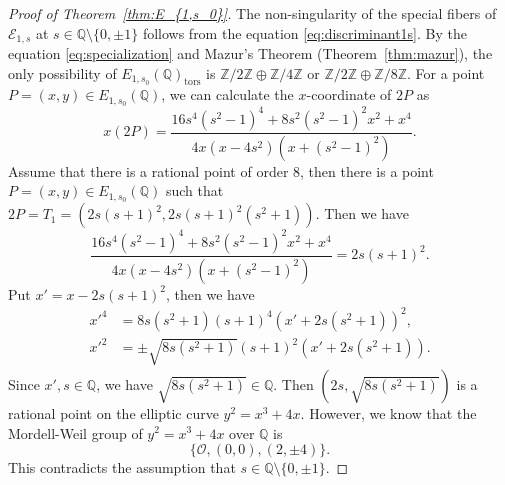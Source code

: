 \documentclass[main]{subfiles}
\begin{document}
\begin{proof}[Proof of Theorem~{\ref{thm:E_{1,s_0}}}]
    The non-singularity of the special fibers of $\mathcal{E}_{1,s}$ at $s \in \mathbb{Q} \setminus \{0,\pm 1 \}$ follows from the equation \eqref{eq:discriminant1s}.
    By the equation \eqref{eq:specialization} and Mazur's Theorem (Theorem~\ref{thm:mazur}), the only possibility of $E_{1,s_0}(\mathbb{Q})_{\text{tors}}$ is $\mathbb{Z} / 2 \mathbb{Z} \oplus \mathbb{Z} / 4 \mathbb{Z}$ or $\mathbb{Z} / 2 \mathbb{Z} \oplus \mathbb{Z} / 8 \mathbb{Z}$.
    For a point $P=(x,y) \in E_{1,s_0}(\mathbb{Q})$, we can calculate the $x$-coordinate of $2P$ as
    \begin{equation*}
        x(2P) = \frac{16s^{4}(s^{2} - 1)^{4} + 8 s^{2}(s^{2} - 1)^{2} x^{2} + x^{4}}{4 x (x - 4s^{2}) (x + (s^{2} - 1)^{2})}.
    \end{equation*}
    Assume that there is a rational point of order $8$, then there is a point $P=(x,y) \in E_{1,s_0}(\mathbb{Q})$ such that $2P = T_1 = (2s(s+1)^2, 2s(s+1)^2(s^2+1))$.
    Then we have
    \begin{equation*}
        \frac{16s^{4}(s^{2} - 1)^{4} + 8 s^{2}(s^{2} - 1)^{2} x^{2} + x^{4}}{4 x (x - 4s^{2}) (x + (s^{2} - 1)^{2})} = 2s(s + 1)^{2}.
    \end{equation*}
    Put $x' = x - 2s(s+1)^2$, then we have
    \begin{align*}
        x'^4 & = 8s(s^{2} + 1)(s + 1)^{4}(x' + 2s(s^2+1))^{2},        \\
        x'^2 & = \pm \sqrt{8 s (s^2 + 1)} (s+1)^{2} (x' + 2s(s^2+1)).
    \end{align*}
    Since $x', s \in \mathbb{Q}$, we have $\sqrt{8 s (s^2 + 1)} \in \mathbb{Q}$.
    Then $(2s, \sqrt{8 s (s^2 + 1)})$ is a rational point on the elliptic curve $y^2 = x^3 + 4x$.
    However, we know that the Mordell-Weil group of $y^2 = x^3 + 4x$ over $\mathbb{Q}$ is
    \begin{equation*}
        \{\mathcal{O}, (0,0), (2,\pm 4) \}.
    \end{equation*}
    This contradicts the assumption that $s \in \mathbb{Q} \setminus \{0,\pm 1 \}$.
\end{proof}
\end{document}
